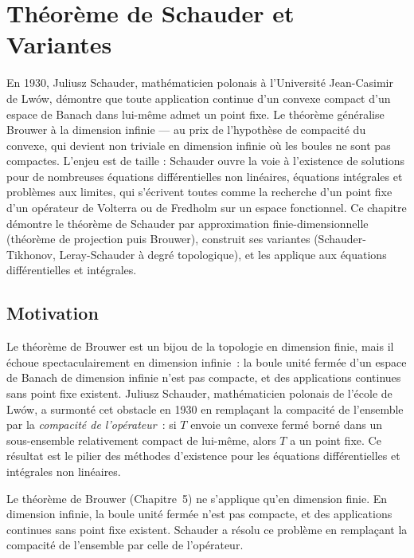 \chapter{Th\'eor\`eme de Schauder et Variantes}\label{ch:schauder}

En 1930, Juliusz Schauder, mathématicien polonais à l'Université Jean-Casimir de Lwów, démontre que toute application continue d'un convexe compact d'un espace de Banach dans lui-même admet un point fixe. Le théorème généralise Brouwer à la dimension infinie --- au prix de l'hypothèse de compacité du convexe, qui devient non triviale en dimension infinie où les boules ne sont pas compactes. L'enjeu est de taille : Schauder ouvre la voie à l'existence de solutions pour de nombreuses équations différentielles non linéaires, équations intégrales et problèmes aux limites, qui s'écrivent toutes comme la recherche d'un point fixe d'un opérateur de Volterra ou de Fredholm sur un espace fonctionnel. Ce chapitre démontre le théorème de Schauder par approximation finie-dimensionnelle (théorème de projection puis Brouwer), construit ses variantes (Schauder-Tikhonov, Leray-Schauder à degré topologique), et les applique aux équations différentielles et intégrales.

\section{Motivation}

Le th\'eor\`eme de Brouwer est un bijou de la topologie en dimension finie, mais il \'echoue spectaculairement en dimension infinie~: la boule unit\'e ferm\'ee d'un espace de Banach de dimension infinie n'est pas compacte, et des applications continues sans point fixe existent. Juliusz Schauder, math\'ematicien polonais de l'\'ecole de Lw\'ow, a surmont\'e cet obstacle en 1930 en rempla\c{c}ant la compacit\'e de l'ensemble par la \emph{compacit\'e de l'op\'erateur}~: si $T$ envoie un convexe ferm\'e born\'e dans un sous-ensemble relativement compact de lui-m\^eme, alors $T$ a un point fixe. Ce r\'esultat est le pilier des m\'ethodes d'existence pour les \'equations diff\'erentielles et int\'egrales non lin\'eaires.

Le th\'eor\`eme de Brouwer (Chapitre~5) ne s'applique qu'en dimension finie.
En dimension infinie, la boule unit\'e ferm\'ee n'est pas compacte, et des
applications continues sans point fixe existent. Schauder a r\'esolu ce
probl\`eme en rempla\c{c}ant la compacit\'e de l'ensemble par celle de l'op\'erateur.

